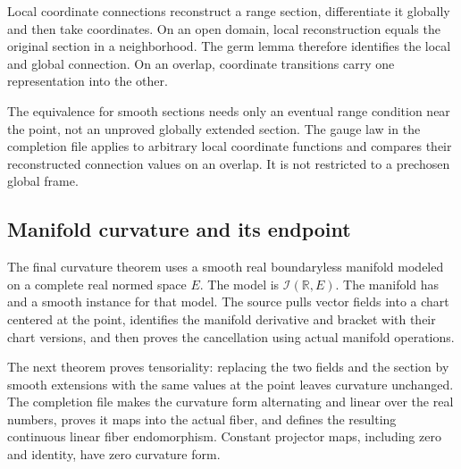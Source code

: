 Local coordinate connections reconstruct a range section, differentiate it globally and then take coordinates. On an open domain, local reconstruction equals the original section in a neighborhood. The germ lemma therefore identifies the local and global connection. On an overlap, coordinate transitions carry one representation into the other.


The equivalence for smooth sections needs only an eventual range condition near the point, not an unproved globally extended section. The gauge law in the completion file applies to arbitrary local coordinate functions and compares their reconstructed connection values on an overlap. It is not restricted to a prechosen global frame.

\subsection{Manifold curvature and its endpoint}
The final curvature theorem uses a smooth real boundaryless manifold modeled on a complete real normed space $E$. The model is $\mathcal I(\mathbb R,E)$. The manifold has  and a smooth  instance for that model. The source pulls vector fields into a chart centered at the point, identifies the manifold derivative and bracket with their chart versions, and then proves the cancellation using actual manifold operations.



The next theorem proves tensoriality: replacing the two fields and the section by smooth extensions with the same values at the point leaves curvature unchanged. The completion file makes the curvature form alternating and linear over the real numbers, proves it maps into the actual fiber, and defines the resulting continuous linear fiber endomorphism. Constant projector maps, including zero and identity, have zero curvature form.

